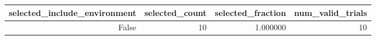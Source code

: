 \begin{tabular}{rrrr}
\toprule
selected_include_environment & selected_count & selected_fraction & num_valid_trials \\
\midrule
False & 10 & 1.000000 & 10 \\
\bottomrule
\end{tabular}
